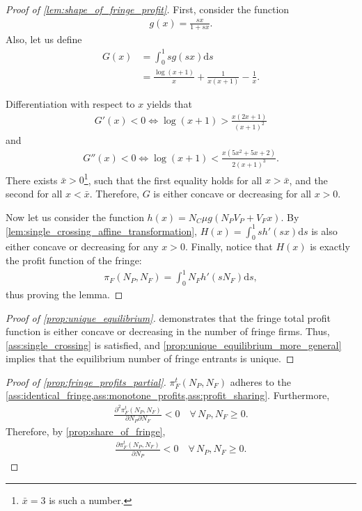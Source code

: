 \documentclass[a4paper]{article}
\newcommand{\ds}{\mathrm{d}s}
\begin{document}
\begin{proof}[Proof of \cref{lem:shape_of_fringe_profit}]
    First, consider the function
    \begin{align*}
        g(x) = \frac{sx}{1 + sx}.
    \end{align*}
    Also, let us define
    \begin{align*}
        G(x) &= \int_0^1 s g(sx) \ds \\
        &= \frac{\log(x+1)}{x} + \frac{1}{x(x+1)} - \frac{1}{x}.
    \end{align*}

    Differentiation with respect to $x$ yields that
    \begin{align*}
        G'(x) < 0 \iff \log(x+1) > \frac{x (2x+1)}{(x+1)^2}
    \end{align*}
    and
    \begin{align*}
        G''(x) < 0 \iff \log(x+1) < \frac{x (5x^2 + 5x + 2)}{2 (x+1)^3}.
    \end{align*}
    There exists $\bar{x} > 0$\footnote{
        $\bar{x} = 3$ is such a number.
    }, such that the first equality holds for all $x > \bar{x}$, and the second for all $x < \bar{x}$.
    Therefore, $G$ is either concave or decreasing for all $x > 0$.

    Now let us consider the function $h(x) = N_C \mu g(N_P V_P + V_F x)$.
    By \cref{lem:single_crossing_affine_transformation}, $H(x) = \int_0^1 s h'(sx) \ds$ is also either concave or decreasing for any $x > 0$.
    Finally, notice that $H(x)$ is exactly the profit function of the fringe:
    \begin{align*}
        \pi_F(N_P, N_F) = \int_0^1 N_F h'(s N_F) \ds,
    \end{align*}
    thus proving the lemma.
\end{proof}

\begin{proof}[Proof of \cref{prop:unique_equilibrium}]
     demonstrates that the fringe total profit function is either concave or decreasing in the number of fringe firms.
    Thus, \cref{ass:single_crossing} is satisfied, and \cref{prop:unique_equilibrium_more_general} implies that the equilibrium number of fringe entrants is unique.
\end{proof}

\begin{proof}[Proof of \cref{prop:fringe_profits_partial}]
    $\pi^t_F(N_P ,N_F)$ adheres to the \cref{ass:identical_fringe,ass:monotone_profits,ass:profit_sharing}.
    Furthermore, 
    \begin{align*}
        \frac{\partial^2 \pi^t_F(N_P ,N_F)}{\partial N_P \partial N_F} < 0 \quad \forall\, N_P, N_F \geq 0.
    \end{align*}
    Therefore, by \cref{prop:share_of_fringe},
    \begin{align*}
        \frac{\partial \pi^t_F(N_P, N_F)}{\partial N_P} < 0 \quad \forall\, N_P, N_F \geq 0.
    \end{align*}
\end{proof}
\end{document}
